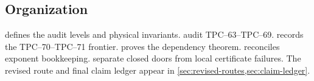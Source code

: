 \subsection{Organization}

 defines the audit levels and physical invariants.
audit TPC--63--TPC--69.
 records the TPC--70--TPC--71 frontier.
 proves the dependency theorem.
 reconciles exponent bookkeeping.
 separate closed doors from local
certificate failures.  The revised route and final claim ledger appear in
\cref{sec:revised-routes,sec:claim-ledger}.
